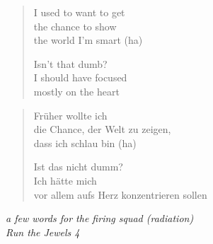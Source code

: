 \clearpage\thispagestyle{empty}\vspace*{\fill}

\begin{verse}
I used to want to get \\
the chance to show \\
the world I'm smart (ha)

Isn't that dumb? \\
I should have focused \\
mostly on the heart
\end{verse}
\begin{verse}\small
Früher wollte ich \\
die Chance, der Welt zu zeigen, \\
dass ich schlau bin (ha)

Ist das nicht dumm? \\
Ich hätte mich \\
vor allem aufs Herz konzentrieren sollen
\end{verse}
\begin{flushright}\small\itshape
a few words for the firing squad (radiation) \\
Run the Jewels 4
\end{flushright}

\vspace*{\fill}\clearpage
